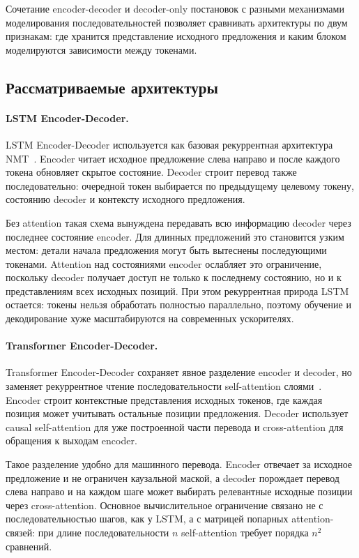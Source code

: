 Сочетание encoder-decoder и decoder-only постановок с разными механизмами моделирования последовательностей позволяет сравнивать архитектуры по двум признакам: где хранится представление исходного предложения и каким блоком моделируются зависимости между токенами.

\subsection{Рассматриваемые архитектуры}

\paragraph{LSTM Encoder-Decoder.}
LSTM Encoder-Decoder используется как базовая рекуррентная архитектура NMT~\cite{seq2seq,luong}. Encoder читает исходное предложение слева направо и после каждого токена обновляет скрытое состояние. Decoder строит перевод также последовательно: очередной токен выбирается по предыдущему целевому токену, состоянию decoder и контексту исходного предложения.

Без attention такая схема вынуждена передавать всю информацию decoder через последнее состояние encoder. Для длинных предложений это становится узким местом: детали начала предложения могут быть вытеснены последующими токенами. Attention над состояниями encoder ослабляет это ограничение, поскольку decoder получает доступ не только к последнему состоянию, но и к представлениям всех исходных позиций. При этом рекуррентная природа LSTM остается: токены нельзя обработать полностью параллельно, поэтому обучение и декодирование хуже масштабируются на современных ускорителях.

\paragraph{Transformer Encoder-Decoder.}
Transformer Encoder-Decoder сохраняет явное разделение encoder и decoder, но заменяет рекуррентное чтение последовательности self-attention слоями~\cite{transformer}. Encoder строит контекстные представления исходных токенов, где каждая позиция может учитывать остальные позиции предложения. Decoder использует causal self-attention для уже построенной части перевода и cross-attention для обращения к выходам encoder.

Такое разделение удобно для машинного перевода. Encoder отвечает за исходное предложение и не ограничен каузальной маской, а decoder порождает перевод слева направо и на каждом шаге может выбирать релевантные исходные позиции через cross-attention. Основное вычислительное ограничение связано не с последовательностью шагов, как у LSTM, а с матрицей попарных attention-связей: при длине последовательности $n$ self-attention требует порядка $n^2$ сравнений.

